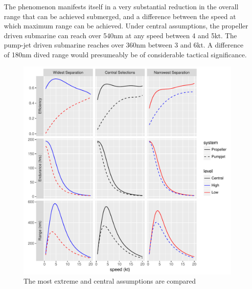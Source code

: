 \documentclass{article}\usepackage[]{graphicx}\usepackage[]{color}
\makeatletter
\def\maxwidth{ %
  \ifdim\Gin@nat@width>\linewidth
    \linewidth
  \else
    \Gin@nat@width
  \fi
}
\newenvironment{knitrout}{}{} %
\makeatother
\begin{document}
The phenomenon manifests itself in a very substantial reduction in the overall range that can be achieved submerged, and a difference between the speed at which maximum range can be achieved.  Under central assumptions, the propeller driven submarine can reach over 540nm at any speed between 4 and 5kt. The pump-jet driven submarine reaches over 360nm between 3 and 6kt. A difference of 180nm dived range would presumeably be of considerable tactical significance.



\begin{figure}
\begin{knitrout}
\color{fgcolor}

{\centering \includegraphics[width=\maxwidth]{figures/plots-plot_results1-1} 

}



\end{knitrout}
\caption{The most extreme and central assumptions are compared}
\label{fig:central_extreme}
\end{figure}
\end{document}
